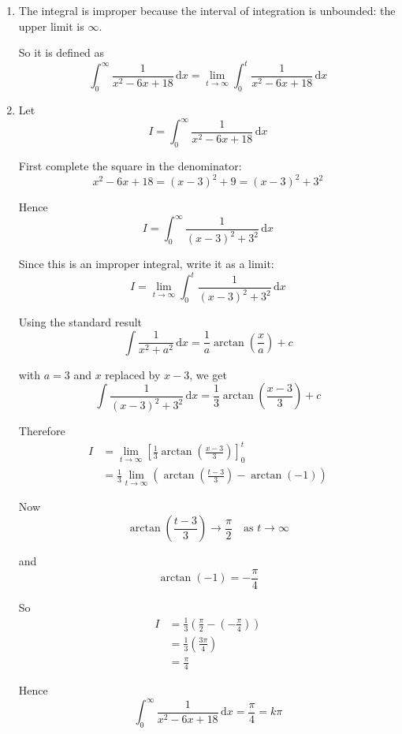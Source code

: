 \documentclass[leqno]{article}
\begin{document}
\begin{enumerate}[
  label=\textbf{\arabic*.},
  leftmargin=*,
  topsep=0pt,
  partopsep=0pt,
  parsep=0pt
]
\vspace*{10pt}

\begin{djsSolution}
\begin{enumerate}[label=\textbf{(\alph*)}]
  \item The integral is improper because the interval of integration is unbounded: the upper limit is $\infty$.

  So it is defined as
  \[
  \int_{0}^{\infty} \frac{1}{x^2-6x+18}\,\mathrm{d}x
  =
  \lim_{t\to\infty}\int_{0}^{t}\frac{1}{x^2-6x+18}\,\mathrm{d}x
  \]

  \item Let
  \[
  I=\int_{0}^{\infty}\frac{1}{x^2-6x+18}\,\mathrm{d}x
  \]

  First complete the square in the denominator:
  \[
  x^2-6x+18=(x-3)^2+9=(x-3)^2+3^2
  \]

  Hence
  \[
  I=\int_{0}^{\infty}\frac{1}{(x-3)^2+3^2}\,\mathrm{d}x
  \]

  Since this is an improper integral, write it as a limit:
  \[
  I=\lim_{t\to\infty}\int_{0}^{t}\frac{1}{(x-3)^2+3^2}\,\mathrm{d}x
  \]

  Using the standard result
  \[
  \int \frac{1}{x^2+a^2}\,\mathrm{d}x=\frac{1}{a}\arctan\left(\frac{x}{a}\right)+c
  \]

  with $a=3$ and $x$ replaced by $x-3$, we get
  \[
  \int \frac{1}{(x-3)^2+3^2}\,\mathrm{d}x
  =
  \frac{1}{3}\arctan\left(\frac{x-3}{3}\right)+c
  \]

  Therefore
  \begin{align*}
  I
  &=\lim_{t\to\infty}\left[\frac{1}{3}\arctan\left(\frac{x-3}{3}\right)\right]_{0}^{t} \\
  &=\frac{1}{3}\lim_{t\to\infty}\left(\arctan\left(\frac{t-3}{3}\right)-\arctan(-1)\right)
  \end{align*}

  Now
  \[
  \arctan\left(\frac{t-3}{3}\right)\to \frac{\pi}{2}
  \quad\text{as } t\to\infty
  \]

  and
  \[
  \arctan(-1)=-\frac{\pi}{4}
  \]

  So
  \begin{align*}
  I
  &=\frac{1}{3}\left(\frac{\pi}{2}-\left(-\frac{\pi}{4}\right)\right) \\
  &=\frac{1}{3}\left(\frac{3\pi}{4}\right) \\
  &=\frac{\pi}{4}
  \end{align*}

  Hence
  \[
  \int_{0}^{\infty}\frac{1}{x^2-6x+18}\,\mathrm{d}x=\frac{\pi}{4}=k\pi
  \]


\end{enumerate}
\end{djsSolution}
\end{enumerate}
\end{document}
